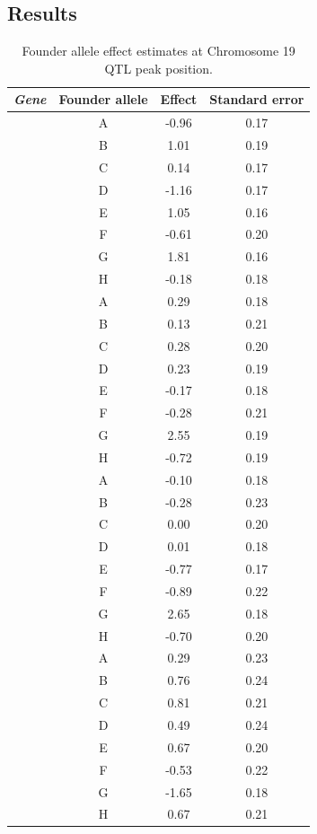 \documentclass[oneside]{book}\usepackage[]{graphicx}\usepackage[]{color}
\begin{document}
\subsection{Results}

\begin{table}[ht]
\caption{Founder allele effect estimates at Chromosome 19 QTL peak position.}\label{tab:effects}
\centering
\begin{tabular}{>{\em}cccc}
  \hline
 Gene & Founder allele & Effect & Standard error \\
  \hline
\multirow{8}{*}{Asah2} & A & -0.96 & 0.17 \\
  & B & 1.01 & 0.19 \\
  & C & 0.14 & 0.17 \\
  & D & -1.16 & 0.17 \\
  & E & 1.05 & 0.16 \\
  & F & -0.61 & 0.20 \\
  & G & 1.81 & 0.16 \\
  & H & -0.18 & 0.18 \\
  \hline
  \multirow{8}{*}{Lipo1} & A & 0.29 & 0.18 \\
  & B & 0.13 & 0.21 \\
  & C & 0.28 & 0.20 \\
  & D & 0.23 & 0.19 \\
  & E & -0.17 & 0.18 \\
  & F & -0.28 & 0.21 \\
  & G & 2.55 & 0.19 \\
  & H & -0.72 & 0.19 \\
  \hline
\multirow{8}{*}{Lipo2} & A & -0.10 & 0.18 \\
  & B & -0.28 & 0.23 \\
  & C & 0.00 & 0.20 \\
  & D & 0.01 & 0.18 \\
  & E & -0.77 & 0.17 \\
  & F & -0.89 & 0.22 \\
  & G & 2.65 & 0.18 \\
  & H & -0.70 & 0.20 \\
   \hline
\multirow{8}{*}{4933413C19Rik} & A & 0.29 & 0.23 \\
  & B & 0.76 & 0.24 \\
  & C & 0.81 & 0.21 \\
  & D & 0.49 & 0.24 \\
  & E & 0.67 & 0.20 \\
  & F & -0.53 & 0.22 \\
  & G & -1.65 & 0.18 \\
  & H & 0.67 & 0.21 \\
   \hline
\end{tabular}
\end{table}
\end{document}
